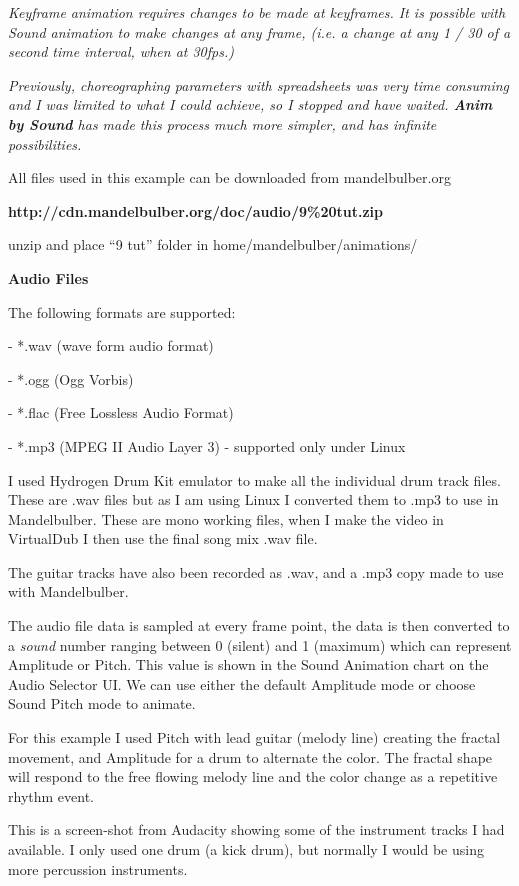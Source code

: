 \emph{Keyframe animation requires changes to be made at keyframes. It is
possible with Sound animation to make changes at any frame, (i.e. a
change at any 1 / 30 of a second time interval, when at 30fps.)}

\emph{Previously, choreographing parameters with spreadsheets was very
time consuming and I was limited to what I could achieve, so I stopped
and have waited. \textbf{Anim by Sound} has made this process much more
simpler, and has infinite possibilities.}

All files used in this example can be downloaded from mandelbulber.org

\textbf{http://cdn.mandelbulber.org/doc/audio/9\%20tut.zip}

unzip and place ``9 tut'' folder in home/mandelbulber/animations/

\textbf{Audio Files}

The following formats are supported:

- *.wav (wave form audio format)

- *.ogg (Ogg Vorbis)

- *.flac (Free Lossless Audio Format)

- *.mp3 (MPEG II Audio Layer 3) - supported only under Linux

I used Hydrogen Drum Kit emulator to make all the individual drum track
files. These are .wav files but as I am using Linux I converted them to
.mp3 to use in Mandelbulber. These are mono working files, when I make
the video in VirtualDub I then use the final song mix .wav file.

The guitar tracks have also been recorded as .wav, and a .mp3 copy made
to use with Mandelbulber.

The audio file data is sampled at every frame point, the data is then
converted to a \emph{sound} number ranging between 0 (silent) and 1
(maximum) which can represent Amplitude or Pitch. This value is shown in
the Sound Animation chart on the Audio Selector UI. We can use either
the default Amplitude mode or choose Sound Pitch mode to animate.

For this example I used Pitch with lead guitar (melody line) creating
the fractal movement, and Amplitude for a drum to alternate the color.
The fractal shape will respond to the free flowing melody line and the
color change as a repetitive rhythm event.

This is a screen-shot from Audacity showing some of the instrument
tracks I had available. I only used one drum (a kick drum), but normally
I would be using more percussion instruments.

